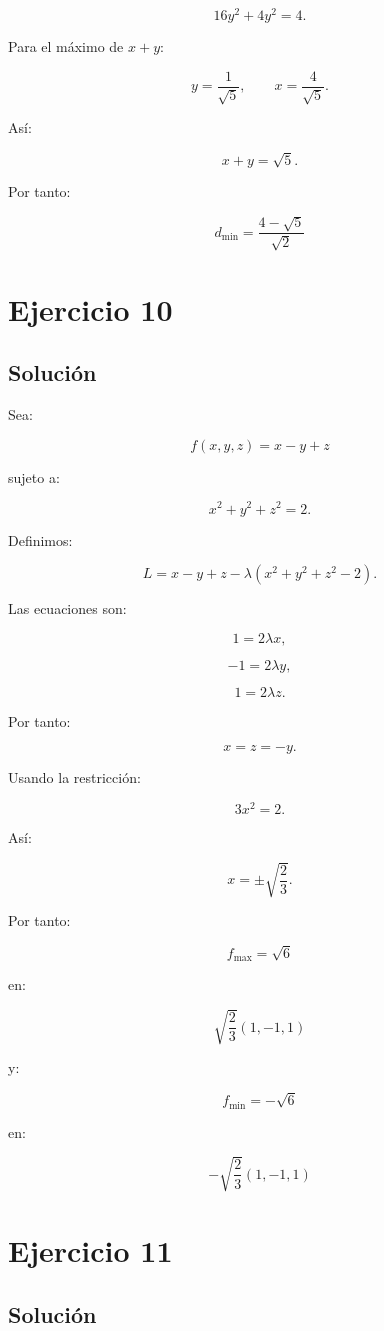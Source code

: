 \documentclass[11pt,a4paper]{article}
\begin{document}
\[
16y^2+4y^2=4.
\]

Para el máximo de \(x+y\):

\[
y=\frac1{\sqrt5},
\qquad
x=\frac4{\sqrt5}.
\]

Así:

\[
x+y=\sqrt5.
\]

Por tanto:

\[
\boxed{
d_{\min}
=
\frac{4-\sqrt5}{\sqrt2}
}
\]

\section{Ejercicio 10}
\subsection{Solución}

Sea:

\[
f(x,y,z)=x-y+z
\]

sujeto a:

\[
x^2+y^2+z^2=2.
\]

Definimos:

\[
L
=
x-y+z
-
\lambda(x^2+y^2+z^2-2).
\]

Las ecuaciones son:

\[
1=2\lambda x,
\]

\[
-1=2\lambda y,
\]

\[
1=2\lambda z.
\]

Por tanto:

\[
x=z=-y.
\]

Usando la restricción:

\[
3x^2=2.
\]

Así:

\[
x=\pm\sqrt{\frac23}.
\]

Por tanto:

\[
\boxed{
f_{\max}=\sqrt6
}
\]

en:

\[
\boxed{
\sqrt{\frac23}(1,-1,1)
}
\]

y:

\[
\boxed{
f_{\min}=-\sqrt6
}
\]

en:

\[
\boxed{
-\sqrt{\frac23}(1,-1,1)
}
\]

\section{Ejercicio 11}
\subsection{Solución}
\end{document}
